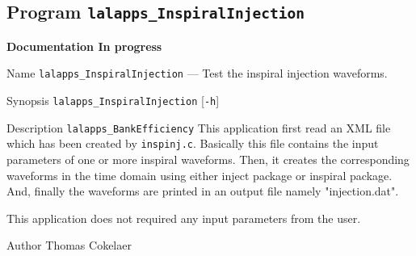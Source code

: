 \subsection{Program \texttt{lalapps\_InspiralInjection}}
\label{program:lalapps-InspiralInjection}
{\LARGE{{\bf Documentation In progress}}}

\begin{entry}

\item[Name]
\verb$lalapps_InspiralInjection$ --- Test the inspiral injection waveforms.

\item[Synopsis]
\verb$lalapps_InspiralInjection$ [\verb$-h$] 

\item[Description]
\verb$lalapps_BankEfficiency$ This application first read an XML file which has been created
by \texttt{inspinj.c}. Basically this file contains the input parameters of one or more
 inspiral waveforms. Then, it creates the corresponding waveforms in the time domain using 
either inject package or inspiral package. And, finally the waveforms are printed in an output
 file namely "injection.dat". 

This application does not required any input parameters from the user. 




\item[Author]
Thomas Cokelaer

\end{entry}
